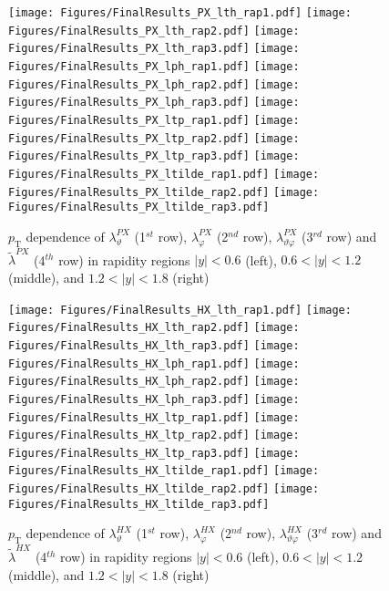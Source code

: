 \documentclass[12pt]{article}
\newcommand{\pT}{p_\mathrm{T}}
\newcommand{\absy}{\left |  y \right |}
\newcommand{\lamthHX}{\lambda^{\scriptscriptstyle HX}_\vartheta}
\newcommand{\lamphHX}{\lambda^{\scriptscriptstyle HX}_\varphi}
\newcommand{\lamthphHX}{\lambda^{\scriptscriptstyle HX}_{\vartheta \varphi}}
\newcommand{\lamtildeHX}{\tilde{\lambda}^{\scriptscriptstyle HX}}
\newcommand{\lamthPX}{\lambda^{\scriptscriptstyle PX}_\vartheta}
\newcommand{\lamphPX}{\lambda^{\scriptscriptstyle PX}_\varphi}
\newcommand{\lamthphPX}{\lambda^{\scriptscriptstyle PX}_{\vartheta \varphi}}
\newcommand{\lamtildePX}{\tilde{\lambda}^{\scriptscriptstyle PX}}
\begin{document}



\begin{figure}[htbp]
\centering
\texttt{[image: Figures/FinalResults\_PX\_lth\_rap1.pdf]}
\texttt{[image: Figures/FinalResults\_PX\_lth\_rap2.pdf]}
\texttt{[image: Figures/FinalResults\_PX\_lth\_rap3.pdf]}
\texttt{[image: Figures/FinalResults\_PX\_lph\_rap1.pdf]}
\texttt{[image: Figures/FinalResults\_PX\_lph\_rap2.pdf]}
\texttt{[image: Figures/FinalResults\_PX\_lph\_rap3.pdf]}
\texttt{[image: Figures/FinalResults\_PX\_ltp\_rap1.pdf]}
\texttt{[image: Figures/FinalResults\_PX\_ltp\_rap2.pdf]}
\texttt{[image: Figures/FinalResults\_PX\_ltp\_rap3.pdf]}
\texttt{[image: Figures/FinalResults\_PX\_ltilde\_rap1.pdf]}
\texttt{[image: Figures/FinalResults\_PX\_ltilde\_rap2.pdf]}
\texttt{[image: Figures/FinalResults\_PX\_ltilde\_rap3.pdf]}
\caption{$\pT$ dependence of $\lamthPX$
(1$^{st}$ row), $\lamphPX$ (2$^{nd}$ row), $\lamthphPX$ (3$^{rd}$ row) and 
$\lamtildePX$ (4$^{th}$ row) in rapidity regions $\absy<0.6$ (left), 
$0.6<\absy<1.2$ (middle), and $1.2<\absy<1.8$ (right)}
\end{figure}
\clearpage







\begin{figure}[htbp]
\centering
\texttt{[image: Figures/FinalResults\_HX\_lth\_rap1.pdf]}
\texttt{[image: Figures/FinalResults\_HX\_lth\_rap2.pdf]}
\texttt{[image: Figures/FinalResults\_HX\_lth\_rap3.pdf]}
\texttt{[image: Figures/FinalResults\_HX\_lph\_rap1.pdf]}
\texttt{[image: Figures/FinalResults\_HX\_lph\_rap2.pdf]}
\texttt{[image: Figures/FinalResults\_HX\_lph\_rap3.pdf]}
\texttt{[image: Figures/FinalResults\_HX\_ltp\_rap1.pdf]}
\texttt{[image: Figures/FinalResults\_HX\_ltp\_rap2.pdf]}
\texttt{[image: Figures/FinalResults\_HX\_ltp\_rap3.pdf]}
\texttt{[image: Figures/FinalResults\_HX\_ltilde\_rap1.pdf]}
\texttt{[image: Figures/FinalResults\_HX\_ltilde\_rap2.pdf]}
\texttt{[image: Figures/FinalResults\_HX\_ltilde\_rap3.pdf]}
\caption{$\pT$ dependence of $\lamthHX$
(1$^{st}$ row), $\lamphHX$ (2$^{nd}$ row), $\lamthphHX$ (3$^{rd}$ row) and 
$\lamtildeHX$ (4$^{th}$ row) in rapidity regions $\absy<0.6$ (left), 
$0.6<\absy<1.2$ (middle), and $1.2<\absy<1.8$ (right)}
\end{figure}
\clearpage
\end{document}
